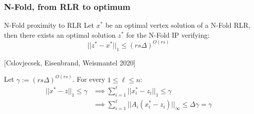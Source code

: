 \documentclass{beamer}
\begin{document}
    \begin{frame}
        \frametitle{N-Fold, from RLR to optimum}
        \begin{block}{N-Fold proximity to RLR}
            Let $x^*$ be an optimal vertex solution of a N-Fold RLR, then there exists an optimal solution $z^*$ for the N-Fold IP verifying:  
            \begin{equation*}
                ||z^* - x^*||_1 \leq (rs\Delta)^{O(rs)}
            \end{equation*}
        \end{block}
        [Cslovjecsek, Eisenbrand, Weismantel 2020]
        \vspace{0.5cm}
        
        Let $\gamma := (rs\Delta)^{O(rs)}$. For every $1 \leq \ell \leq n$:
        \vspace{-0.25cm}
        \begin{align*}
            ||x^* - z||_1 \leq \gamma 
            & \implies \sum_{i=1}^\ell ||x_i^* - z_i||_1 \leq \gamma\\ 
            & \implies \sum_{i=1}^\ell ||A_i(x_i^* - z_i)||_\infty \leq \Delta \gamma = \gamma
        \end{align*}
        
    \end{frame}
\end{document}
